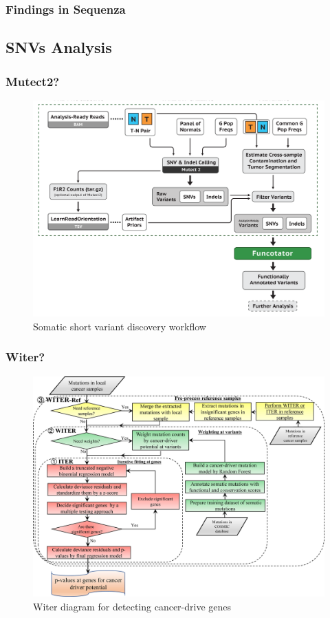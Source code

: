 \documentclass{beamer}
\begin{document}
    \begin{frame}
        \frametitle{Findings in Sequenza}
    \end{frame}

    \subsection{SNVs Analysis}
    \begin{frame}
        \frametitle{Mutect2?}

        \begin{figure}
            \includegraphics[width=0.6 \linewidth]{figures/Workflow/somatic_short_variants.png}
            \caption{Somatic short variant discovery workflow \protect\cite{gatk1, gatk2}}
        \end{figure}
    \end{frame}

    \begin{frame}
        \frametitle{Witer?}

        \begin{figure}
            \includegraphics[width=0.6 \linewidth]{figures/Workflow/witer.jpg}
            \caption{Witer diagram for detecting cancer-drive genes \protect\cite{witer1}}
        \end{figure}
    \end{frame}
\end{document}
